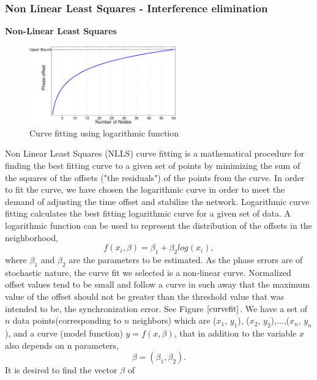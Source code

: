 \documentclass[journal]{IEEEtran}
\begin{document}
\subsubsection{\textbf{Non Linear Least Squares - Interference
elimination}} 
\textbf{Non-Linear Least Squares} \newline 
\begin{figure}[b]
\centering
\includegraphics[width=2.5in]{curvefit}
\caption{Curve fitting using logarithmic function} \label{curvefit}
\end{figure}
\noindent 
Non Linear Least Squares (NLLS) curve fitting  is a mathematical procedure for
finding the best fitting curve to a given set of points by
minimizing the sum of the squares of the offsets ("the residuals")
of the points from the curve. In order to fit the curve, we have
chosen the logarithmic curve in order to meet the demand of
adjusting the time offset and stabilize the network. Logarithmic
curve fitting calculates the best fitting logarithmic curve for a
given set of data. A logarithmic function can be used to represent
the distribution of the offsets in the neighborhood,
\begin{equation}
 f(x_i,\beta)= \beta _1 + \beta_2log(x_i),
\end{equation}
where $\beta_1$ and $\beta_2$ are the parameters to be estimated.\newline
\noindent As the phase errors are of stochastic nature, the curve fit
we selected is a non-linear curve. Normalized offset values tend to
be small and follow a curve in such away that the maximum value of
the offset should not be greater than the threshold value that was
intended to be, the synchronization error. See Figure $\ref{curvefit}$.
\newline 
We have a set of $n$ data points(corresponding to $n$ neighbors) which are ($x_1$, $y_1$),
($x_2$, $y_2$),$\dots$,($x_n$, $y_n$), and a curve (model function)
$y= f(x, \beta)$, that in addition to the variable $x$ also depends on
n parameters,
\begin{equation}
\beta = (\beta_1, \beta_2).
\end{equation}
It is desired to find the vector $\beta$ of
\end{document}
